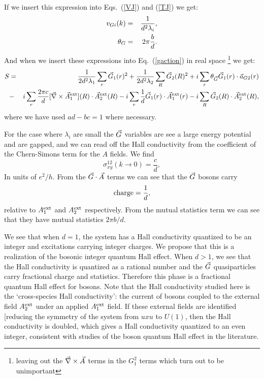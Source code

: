 If we insert this expression into Eqs.~(\ref{VJ}) and (\ref{TJ}) we get:
\begin{eqnarray}
v_{G i}(k)&=&\frac{1}{d^2\lambda_i},\label{vgd2} \\
\theta_{G}&=&2\pi\frac{b}{d}.\label{tg}
\end{eqnarray}
And when we insert these expressions into Eq.~(\ref{gaction}) in real space
\footnote{leaving out the $\vec{\nabla}\times\vec{A}$ terms in the $G_1^2$ terms which turn out to be unimportant}
we get:
\begin{eqnarray}
S&=&\frac{1}{2d^2\lambda_1}\sum_r \vec{G}_1(r)^2
+\frac{1}{2d^2\lambda_2}\sum_R \vec{G}_2(R)^2
+i\sum_r \theta_{\vec{G}} \vec{G}_1(r)\cdot \vec{a}_{G2}(r)\\
&-&i\sum_r \frac{2\pi c}{d} [\vec{\nabla}\times\vec{A}_{1}^{\rm ext}](R)\cdot \vec{A}_{2}^{\rm ext}(R)\nonumber
- i\sum_r \frac{1}{d} \vec{G}_1(r) \cdot \vec{A}_{1}^{\rm ext}(r) -i\sum_R\vec{G}_2(R) \cdot \vec{A}_{2}^{\rm ext}(R),
\label{gaction}
\end{eqnarray}
where we have used $ad-bc=1$ where necessary. 

For the case where $\lambda_i$ are small the $\vec{G}$ variables are see a large energy potential and are gapped, and we can read off the Hall conductivity from the coefficient of the Chern-Simons term for the $A$ fields. We find
\begin{equation}
\sigma_{xy}^{12}(k\rightarrow0)=\frac{c}{d},
\label{sigma}
\end{equation}
In units of $e^2/h$. From the $\vec{G}\cdot\vec{A}$ terms we can see that the $\vec{G}$ bosons carry 
\begin{equation}
{\rm charge} = \frac{1}{d}, \label{charge1d}
\end{equation}
relative to $A^{\rm ext}_1$ and $A^{\rm ext}_2$ respectively.
From the mutual statistics term we can see that they have mutual statistics $2\pi b/d$. 

We see that when $d=1$, the system has a Hall conductivity quantized to be an integer and excitations carrying integer charges. We propose that this is a realization of the bosonic integer quantum Hall effect.\cite{LuVishwanath2012}  When $d>1$, we see that the Hall conductivity is quantized as a rational number and the $\vec{G}$ quasiparticles carry fractional charge and statistics. Therefore this phase is a fractional quantum Hall effect for bosons. Note that the Hall conductivity studied here is the `cross-species Hall conductivity': the current of bosons coupled to the external field $A^{\rm ext}_2$ under an applied $A^{\rm ext}_1$ field. If these external fields are identified [reducing the symmetry of the system from $uxu$ to $U(1)$, then the Hall conductivity is doubled, which gives a Hall conductivity quantized to an even integer, consistent with studies of the boson quantum Hall effect in the literature.

